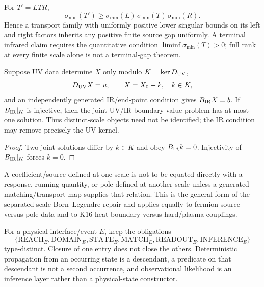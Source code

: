 \documentclass[12pt,a4paper]{article}
\begin{document}
\begin{corollary}
\label{p2a:cor:v3100-uniform-gap-inheritance}
For $T'=LTR$,
\[
 \boxed{\sigma_{\min}(T')\ge
 \sigma_{\min}(L)\,\sigma_{\min}(T)\,\sigma_{\min}(R)}.
\]
Hence a transport family with uniformly positive lower singular bounds on its
left and right factors inherits any positive finite source gap uniformly.  A
terminal infrared claim requires the quantitative condition
$\liminf \sigma_{\min}(T)>0$; full rank at every finite scale alone is not a
terminal-gap theorem.
\end{corollary}

\begin{lemma}
\label{p2a:lem:v3100-separated-scale-kernel-elimination}
Suppose UV data determine $X$ only modulo $K=\ker D_{\rm UV}$,
\[
 D_{\rm UV}X=u,\qquad X=X_0+k,\quad k\in K,
\]
and an independently generated IR/end-point condition gives
$B_{\rm IR}X=b$.  If $B_{\rm IR}|_K$ is injective, then the joint UV/IR
boundary-value problem has at most one solution.  Thus distinct-scale objects
need not be identified; the IR condition may remove precisely the UV kernel.
\end{lemma}
\begin{proof}
Two joint solutions differ by $k\in K$ and obey $B_{\rm IR}k=0$.
Injectivity of $B_{\rm IR}|_K$ forces $k=0$.
\end{proof}

\begin{remark}
\label{p2a:rem:v3100-scale-matching-firewall}
A coefficient/source defined at one scale is not to be equated directly with
a response, running quantity, or pole defined at another scale unless a
generated matching/transport map supplies that relation.  This is the general
form of the separated-scale Born--Legendre repair and applies equally to
fermion source versus pole data and to K16 heat-boundary versus hard/plasma
couplings.
\end{remark}

\begin{definition}
\label{p2a:def:v3100-event-factorization}
For a physical interface/event $E$, keep the obligations
\[
 \{\mathrm{REACH}_E,\mathrm{DOMAIN}_E,\mathrm{STATE}_E,
   \mathrm{MATCH}_E,\mathrm{READOUT}_E,\mathrm{INFERENCE}_E\}
\]
type-distinct.  Closure of one entry does not close the others.
Deterministic propagation from an occurring state is a descendant, a predicate
on that descendant is not a second occurrence, and observational likelihood is
an inference layer rather than a physical-state constructor.
\end{definition}
\end{document}
